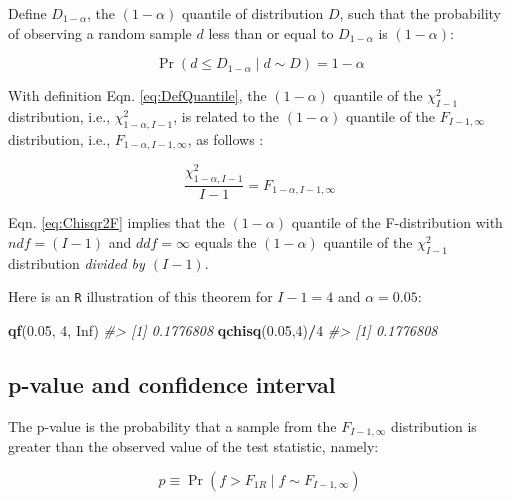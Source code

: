 \documentclass[
]{book}
\newenvironment{Shaded}{\begin{snugshade}}{\end{snugshade}}
\newcommand{\CommentTok}[1]{\textcolor[rgb]{0.56,0.35,0.01}{\textit{#1}}}
\newcommand{\DecValTok}[1]{\textcolor[rgb]{0.00,0.00,0.81}{#1}}
\newcommand{\FloatTok}[1]{\textcolor[rgb]{0.00,0.00,0.81}{#1}}
\newcommand{\KeywordTok}[1]{\textcolor[rgb]{0.13,0.29,0.53}{\textbf{#1}}}
\newcommand{\NormalTok}[1]{#1}
\newcommand{\OperatorTok}[1]{\textcolor[rgb]{0.81,0.36,0.00}{\textbf{#1}}}
\newcommand{\OtherTok}[1]{\textcolor[rgb]{0.56,0.35,0.01}{#1}}
\begin{document}
Define \(D_{1-\alpha}\), the \((1-\alpha)\) quantile of distribution \(D\), such that the probability of observing a random sample \(d\) less than or equal to \(D_{1-\alpha}\) is \((1-\alpha)\):

\begin{equation}
\Pr(d\leq D_{1-\alpha} \mid d \sim D)=1-\alpha
\label{eq:DefQuantile}
\end{equation}

With definition Eqn. \eqref{eq:DefQuantile}, the \((1-\alpha)\) quantile of the \(\chi_{I-1}^2\) distribution, i.e., \(\chi_{1-\alpha,I-1}^2\), is related to the \((1-\alpha)\) quantile of the \(F_{I-1,\infty}\) distribution, i.e., \(F_{1-\alpha,I-1,\infty}\), as follows \citep[see][Eq. 22]{RN1772}:

\begin{equation}
\frac{\chi_{1-\alpha,I-1}^{2}}{I-1} = F_{1-\alpha,I-1,\infty}
\label{eq:Chisqr2F}
\end{equation}

Eqn. \eqref{eq:Chisqr2F} implies that the \((1-\alpha)\) quantile of the F-distribution with \(ndf=(I-1)\) and \(ddf =\infty\) equals the \((1-\alpha)\) quantile of the \(\chi_{I-1}^2\) distribution \emph{divided by \((I-1)\)}.

Here is an \texttt{R} illustration of this theorem for \(I-1 = 4\) and \(\alpha = 0.05\):

\begin{Shaded}
\begin{Highlighting}[]
\KeywordTok{qf}\NormalTok{(}\FloatTok{0.05}\NormalTok{, }\DecValTok{4}\NormalTok{, }\OtherTok{Inf}\NormalTok{)}
\CommentTok{\#\textgreater{} [1] 0.1776808}
\KeywordTok{qchisq}\NormalTok{(}\FloatTok{0.05}\NormalTok{,}\DecValTok{4}\NormalTok{)}\OperatorTok{/}\DecValTok{4}
\CommentTok{\#\textgreater{} [1] 0.1776808}
\end{Highlighting}
\end{Shaded}

\hypertarget{ORMethodIntro-pvalue-ci}{%
\subsection{p-value and confidence interval}\label{ORMethodIntro-pvalue-ci}}

The p-value is the probability that a sample from the \(F_{I-1,\infty}\) distribution is greater than the observed value of the test statistic, namely:

\begin{equation}
p\equiv \Pr(f>F_{1R} \mid f \sim F_{I-1,\infty})
\label{eq:pValue1RMT}
\end{equation}
\end{document}
